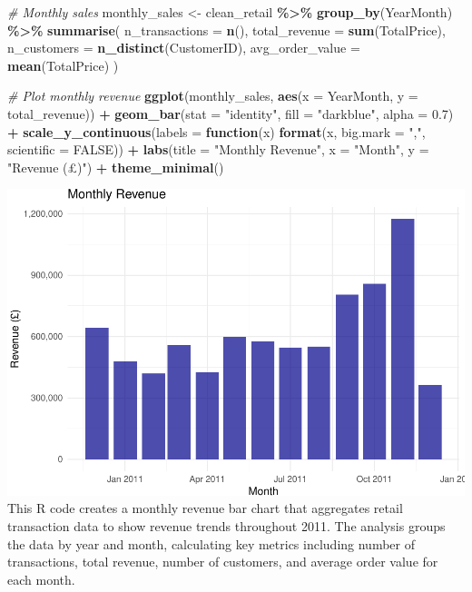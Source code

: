 \documentclass[
]{article}
\newenvironment{Shaded}{\begin{snugshade}}{\end{snugshade}}
\newcommand{\AttributeTok}[1]{\textcolor[rgb]{0.13,0.29,0.53}{#1}}
\newcommand{\CommentTok}[1]{\textcolor[rgb]{0.56,0.35,0.01}{\textit{#1}}}
\newcommand{\ConstantTok}[1]{\textcolor[rgb]{0.56,0.35,0.01}{#1}}
\newcommand{\ControlFlowTok}[1]{\textcolor[rgb]{0.13,0.29,0.53}{\textbf{#1}}}
\newcommand{\FloatTok}[1]{\textcolor[rgb]{0.00,0.00,0.81}{#1}}
\newcommand{\FunctionTok}[1]{\textcolor[rgb]{0.13,0.29,0.53}{\textbf{#1}}}
\newcommand{\NormalTok}[1]{#1}
\newcommand{\OtherTok}[1]{\textcolor[rgb]{0.56,0.35,0.01}{#1}}
\newcommand{\SpecialCharTok}[1]{\textcolor[rgb]{0.81,0.36,0.00}{\textbf{#1}}}
\newcommand{\StringTok}[1]{\textcolor[rgb]{0.31,0.60,0.02}{#1}}
\begin{document}
\begin{Shaded}
\begin{Highlighting}[]
\CommentTok{\# Monthly sales}
\NormalTok{monthly\_sales }\OtherTok{\textless{}{-}}\NormalTok{ clean\_retail }\SpecialCharTok{\%\textgreater{}\%}
  \FunctionTok{group\_by}\NormalTok{(YearMonth) }\SpecialCharTok{\%\textgreater{}\%}
  \FunctionTok{summarise}\NormalTok{(}
    \AttributeTok{n\_transactions =} \FunctionTok{n}\NormalTok{(),}
    \AttributeTok{total\_revenue =} \FunctionTok{sum}\NormalTok{(TotalPrice),}
    \AttributeTok{n\_customers =} \FunctionTok{n\_distinct}\NormalTok{(CustomerID),}
    \AttributeTok{avg\_order\_value =} \FunctionTok{mean}\NormalTok{(TotalPrice)}
\NormalTok{  )}

\CommentTok{\# Plot monthly revenue}
\FunctionTok{ggplot}\NormalTok{(monthly\_sales, }\FunctionTok{aes}\NormalTok{(}\AttributeTok{x =}\NormalTok{ YearMonth, }\AttributeTok{y =}\NormalTok{ total\_revenue)) }\SpecialCharTok{+}
  \FunctionTok{geom\_bar}\NormalTok{(}\AttributeTok{stat =} \StringTok{"identity"}\NormalTok{, }\AttributeTok{fill =} \StringTok{"darkblue"}\NormalTok{, }\AttributeTok{alpha =} \FloatTok{0.7}\NormalTok{) }\SpecialCharTok{+}
  \FunctionTok{scale\_y\_continuous}\NormalTok{(}\AttributeTok{labels =} \ControlFlowTok{function}\NormalTok{(x) }\FunctionTok{format}\NormalTok{(x, }\AttributeTok{big.mark =} \StringTok{","}\NormalTok{, }\AttributeTok{scientific =} \ConstantTok{FALSE}\NormalTok{)) }\SpecialCharTok{+}
  \FunctionTok{labs}\NormalTok{(}\AttributeTok{title =} \StringTok{"Monthly Revenue"}\NormalTok{, }\AttributeTok{x =} \StringTok{"Month"}\NormalTok{, }\AttributeTok{y =} \StringTok{"Revenue (£)"}\NormalTok{) }\SpecialCharTok{+}
  \FunctionTok{theme\_minimal}\NormalTok{()}
\end{Highlighting}
\end{Shaded}

\includegraphics{capstone_customer_segmentation_files/figure-latex/exploratory-data-analysis5-1.pdf}
This R code creates a monthly revenue bar chart that aggregates retail
transaction data to show revenue trends throughout 2011. The analysis
groups the data by year and month, calculating key metrics including
number of transactions, total revenue, number of customers, and average
order value for each month.
\end{document}
